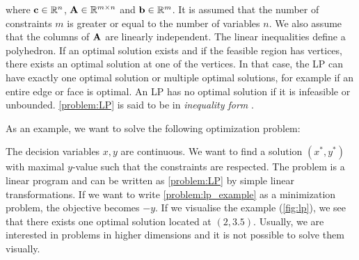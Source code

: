 \quad where $\bold c \in \mathbb{R}^n$, $ \bold A \in \mathbb{R}^{m \times n}$ and $\bold b \in \mathbb{R}^m$. It is assumed that the number of constraints $m$ is greater or equal to the number of variables $n$. %
We also assume that the columns of $\bold A$ are linearly independent.
The linear inequalities define a polyhedron. If an optimal solution exists and if the feasible region has vertices, there exists an optimal solution at one of the vertices.  In that case, the LP can have exactly one optimal solution or multiple optimal solutions, for example if an entire edge or face is optimal. An LP has no optimal solution if it is infeasible or unbounded.
\cref{problem:LP} is said to be in \textit{inequality form}%
\cite{boyd_stephen_convex_2004}.

As an example, we want to solve the following optimization problem: 
The decision variables $x, y$ are continuous. We want to find a solution $(x^*, y^*)$ with maximal $y$-value such that the constraints are respected. The problem is a linear program and can be written as \cref{problem:LP} by simple linear transformations. If we want to write \cref{problem:lp_example} as a minimization problem, the objective becomes $-y$. If we visualise the example (\cref{fig:lp}), we see that there exists one optimal solution located at $(2,3.5)$. Usually, we are interested in problems in higher dimensions and it is not possible to solve them visually.

